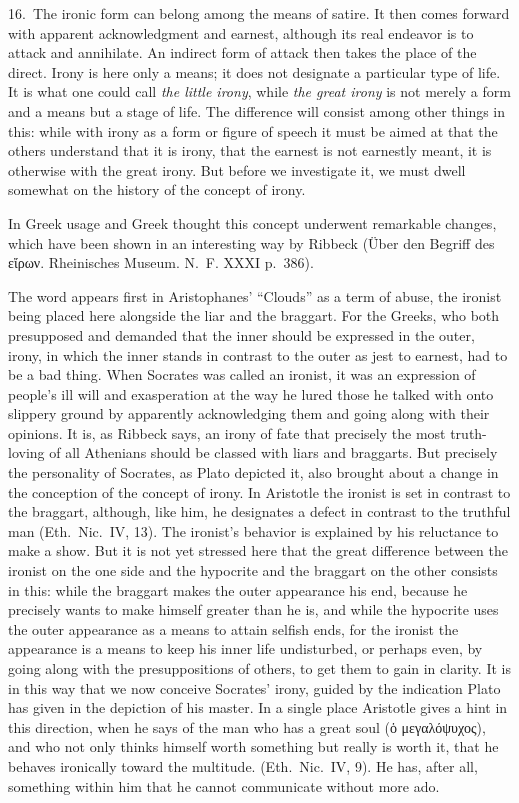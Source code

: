 \documentclass[12pt]{book}
\newcommand{\opage}[1]{\marginnote{\footnotesize\textit{[#1]}}}
\begin{document}
16.~The ironic form can belong among the means of satire. It then comes forward
with apparent acknowledgment and earnest, although its real endeavor is to attack and
annihilate. An indirect form of attack then takes the place of the direct. Irony is
here only a means; it does not designate a particular type of life. It is what one
could call \emph{the little irony}, while \emph{the great irony} is not merely a
form and a means but a stage of life. The difference will consist among other things
in this: while with irony as a form or figure of speech it must be aimed at that the
others understand that it is irony, that the earnest is not earnestly meant, it is
otherwise with the great irony. But before we investigate it, we must dwell somewhat
on the history of the concept of irony.

In Greek usage and Greek thought this concept underwent remarkable changes, which
have been shown in an interesting way by Ribbeck (Über den Begriff des εἴρων.
Rheinisches Museum. N.~F. XXXI p.~386).

The word appears first in Aristophanes' ``Clouds'' as a term of abuse, the ironist
being placed here alongside the liar and the braggart. For the Greeks, who both
presupposed and demanded that the inner should be expressed in the outer, irony, in
which the inner stands in contrast to the outer as jest to earnest, had to be a bad
thing. When Socrates was called an ironist, it was an expression of people's ill
will and exasperation at the way he lured those he talked with onto slippery ground
by apparently acknowledging \opage{62}them and going along with their opinions. It
is, as Ribbeck says, an irony of fate that precisely the most truth-loving of all
Athenians should be classed with liars and braggarts. But precisely the personality
of Socrates, as Plato depicted it, also brought about a change in the conception of
the concept of irony. In Aristotle the ironist is set in contrast to the braggart,
although, like him, he designates a defect in contrast to the truthful man (Eth.\
Nic.\ IV, 13). The ironist's behavior is explained by his reluctance to make a
show. But it is not yet stressed here that the great difference between the ironist
on the one side and the hypocrite and the braggart on the other consists in this:
while the braggart makes the outer appearance his end, because he precisely wants to
make himself greater than he is, and while the hypocrite uses the outer appearance
as a means to attain selfish ends, for the ironist the appearance is a means to keep
his inner life undisturbed, or perhaps even, by going along with the presuppositions
of others, to get them to gain in clarity. It is in this way that we now conceive
Socrates' irony, guided by the indication Plato has given in the depiction of his
master. In a single place Aristotle gives a hint in this direction, when he says of
the man who has a great soul (ὁ μεγαλόψυχος), and who not only thinks himself worth
something but really is worth it, that he behaves ironically toward the multitude.
(Eth.\ Nic.\ IV, 9). %
He has, after all, something within him that he cannot communicate without more ado.
\end{document}
